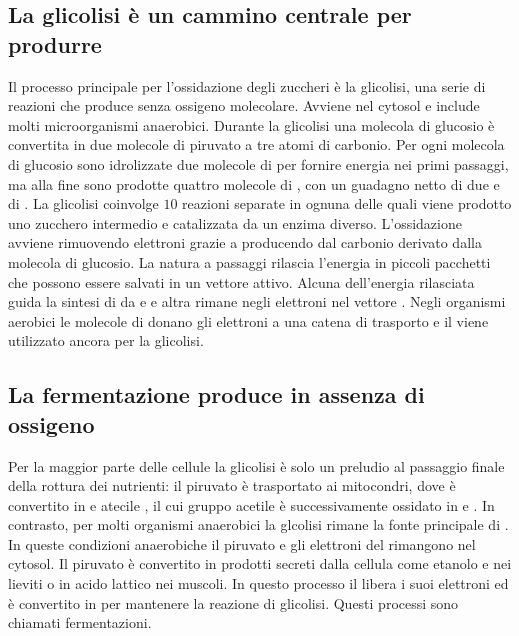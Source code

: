 \subsection{La glicolisi \`e un cammino centrale per produrre }
Il processo principale per l'ossidazione degli zuccheri \`e la glicolisi, una serie di reazioni che produce  senza ossigeno molecolare. Avviene nel cytosol e include molti 
microorganismi anaerobici. Durante la glicolisi una molecola di glucosio \`e convertita in due molecole di piruvato a tre atomi di carbonio. Per ogni molecola di glucosio sono 
idrolizzate due molecole di  per fornire energia nei primi passaggi, ma alla fine sono prodotte quattro molecole di , con un guadagno netto di due  e di 
. La glicolisi coinvolge $10$ reazioni separate in ognuna delle quali viene prodotto uno zucchero intermedio e catalizzata da un enzima diverso. L'ossidazione avviene 
rimuovendo elettroni grazie a  producendo  dal carbonio derivato dalla molecola di glucosio. La natura a passaggi rilascia l'energia in piccoli pacchetti che possono 
essere salvati in un vettore attivo. Alcuna dell'energia rilasciata guida la sintesi di  da  e  e altra rimane negli elettroni nel vettore . Negli 
organismi aerobici le molecole di  donano gli elettroni a una catena di trasporto e il  viene utilizzato ancora per la glicolisi. 
\subsection{La fermentazione produce  in assenza di ossigeno}
Per la maggior parte delle cellule la glicolisi \`e solo un preludio al passaggio finale della rottura dei nutrienti: il piruvato \`e trasportato ai mitocondri, dove \`e convertito in 
 e atecile , il cui gruppo acetile \`e successivamente ossidato in  e . In contrasto, per molti organismi anaerobici la glcolisi rimane la fonte 
principale di . In queste condizioni anaerobiche il piruvato e gli elettroni del  rimangono nel cytosol. Il piruvato \`e convertito in prodotti secreti dalla cellula 
come etanolo e  nei lieviti o in acido lattico nei muscoli. In questo processo il  libera i suoi elettroni ed \`e convertito in  per mantenere la reazione di
glicolisi. Questi processi sono chiamati fermentazioni. 
